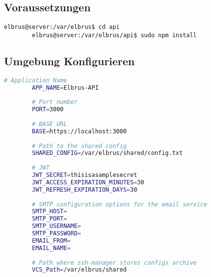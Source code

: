 	\subsection{Voraussetzungen}
	
	\lstset{style=commands}
	\begin{lstlisting}[caption={Nachinstallieren der Abhängigkeiten.}]
		elbrus@server:/var/elbrus$ cd api
		elbrus@server:/var/elbrus/api$ sudo npm install
	\end{lstlisting}

	\subsection[file config]{Umgebung Konfigurieren}
	
	\lstset{style=files}
	\begin{lstlisting}[caption={Anhand von '.env.example' eigene '.env' Datei anlegen.}, language=bash]
		# Application Name
		APP_NAME=Elbrus-API
		
		# Port number
		PORT=3000
		
		# BASE URL
		BASE=https://localhost:3000
		
		# Path to the shared config
		SHARED_CONFIG=/var/elbrus/shared/config.txt
		
		# JWT
		JWT_SECRET=thisisasamplesecret
		JWT_ACCESS_EXPIRATION_MINUTES=30
		JWT_REFRESH_EXPIRATION_DAYS=30
		
		# SMTP configuration options for the email service
		SMTP_HOST=
		SMTP_PORT=
		SMTP_USERNAME=
		SMTP_PASSWORD=
		EMAIL_FROM=
		EMAIL_NAME=
		
		# Path where ssh-manager stores configs archive
		VCS_Path=/var/elbrus/shared
	\end{lstlisting}
	\newpage
	
